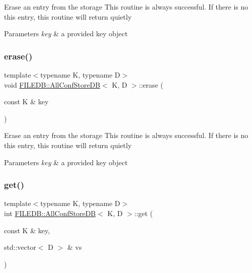 Erase an entry from the storage This routine is always successful. If there is no this entry, this routine will return quietly 
\begin{DoxyParams}{Parameters}
{\em key} & a provided key object \\
\hline
\end{DoxyParams}
\mbox{\label{classFILEDB_1_1AllConfStoreDB_afb092d33f9ca14ca30918d6cb8251fdb}} 
\subsubsection{\texorpdfstring{erase()}{erase()}\hspace{0.1cm}{\footnotesize\ttfamily [2/2]}}
{\footnotesize\ttfamily template$<$typename K, typename D$>$ \\
void \mbox{\hyperlink{classFILEDB_1_1AllConfStoreDB}{F\+I\+L\+E\+D\+B\+::\+All\+Conf\+Store\+DB}}$<$ K, D $>$\+::erase (\begin{DoxyParamCaption}\item[{const K \&}]{key }\end{DoxyParamCaption})\hspace{0.3cm}{\ttfamily [inline]}}

Erase an entry from the storage This routine is always successful. If there is no this entry, this routine will return quietly 
\begin{DoxyParams}{Parameters}
{\em key} & a provided key object \\
\hline
\end{DoxyParams}
\mbox{\label{classFILEDB_1_1AllConfStoreDB_a848466f7dce25cacc4e8560c50240d35}} 
\subsubsection{\texorpdfstring{get()}{get()}\hspace{0.1cm}{\footnotesize\ttfamily [1/2]}}
{\footnotesize\ttfamily template$<$typename K, typename D$>$ \\
int \mbox{\hyperlink{classFILEDB_1_1AllConfStoreDB}{F\+I\+L\+E\+D\+B\+::\+All\+Conf\+Store\+DB}}$<$ K, D $>$\+::get (\begin{DoxyParamCaption}\item[{const K \&}]{key,  }\item[{std\+::vector$<$ D $>$ \&}]{vs }\end{DoxyParamCaption})\hspace{0.3cm}{\ttfamily [inline]}}

